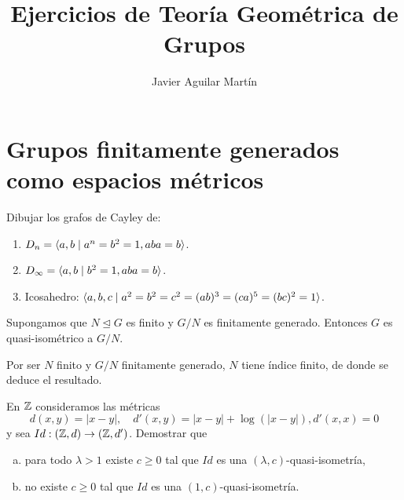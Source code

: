 \documentclass[twoside]{article}
\begin{document}
\title{Ejercicios de Teoría Geométrica de Grupos}
\author{Javier Aguilar Martín}
\maketitle

\section{Grupos finitamente generados como espacios métricos}

\begin{ejercicio}{1.1}
Dibujar los grafos de Cayley de:
\begin{enumerate}
\item $D_n=\langle{a,b\mid a^n=b^2=1,aba=b}\rangle$.
\item $D_\infty=\langle{a,b\mid b^2=1,aba=b}\rangle$.
\item Icosahedro: $\langle{a,b,c\mid a^2=b^2=c^2=(ab)^3=(ca)^5=(bc)^2=1}\rangle$.
\end{enumerate}

\end{ejercicio}
\begin{solucion}

\end{solucion}

\newpage

\begin{ejercicio}{1.2}
Supongamos que $N\trianglelefteq G$ es finito y $G/N$ es finitamente generado. Entonces $G$ es quasi-isométrico a $G/N$. 
\end{ejercicio}
\begin{solucion}
Por ser $N$ finito y $G/N$ finitamente generado, $N$ tiene índice finito, de donde se deduce el resultado. 

\end{solucion}




\newpage

\begin{ejercicio}{1.3}
En $\mathbb{Z}$ consideramos las métricas
\[
d(x,y)=|x-y|,\quad d'(x,y)=|x-y|+\log(|x-y|), d'(x,x)=0
\]
y sea $Id:(\mathbb{Z},d)\to(\mathbb{Z},d')$. Demostrar que
\begin{enumerate}[a)]
\item para todo $\lambda>1$ existe $c\geq 0$ tal que $Id$ es una $(\lambda,c)$-quasi-isometría,
\item no existe $c\geq 0$ tal que $Id$ es una $(1,c)$-quasi-isometría.
\end{enumerate}
\end{ejercicio}
\begin{solucion}

\end{solucion}
\end{document}
